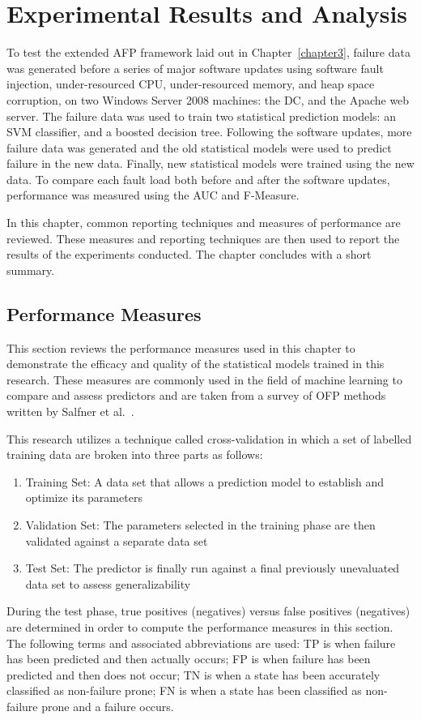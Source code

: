 \chapter{Experimental Results and Analysis} \label{chapter4}
To test the extended \ac{AFP} framework laid out in Chapter~\ref{chapter3},
failure data was generated before a series of major software updates using
software fault injection, under-resourced \ac{CPU}, under-resourced memory, and
heap space corruption, on two Windows Server 2008 machines: the \ac{DC}, and
the Apache web server.  The failure data was used to train two statistical
prediction models: an \ac{SVM} classifier, and a boosted decision tree.
Following the software updates, more failure data was generated and the old
statistical models were used to predict failure in the new data.  Finally, new
statistical models were trained using the new data.  To compare each fault load
both before and after the software updates, performance was measured using the
\ac{AUC} and F-Measure.

In this chapter, common reporting techniques and measures of performance are
reviewed.  These measures and reporting techniques are then used to report the
results of the experiments conducted.  The chapter concludes with a short
summary.

\section{Performance Measures} \label{metrics}
This section reviews the performance measures used in this chapter to
demonstrate the efficacy and quality of the statistical models trained in this
research.  These measures are commonly used in the field of machine learning to
compare and assess predictors and are taken from a survey of \ac{OFP} methods
written by Salfner et al.~\cite{salfnerSurvey}.

This research utilizes a technique called cross-validation in which a set of
labelled training data are broken into three parts as follows:
\begin{enumerate}
\item{Training Set:  A data set that allows a prediction model to establish and
optimize its parameters}
\item{Validation Set:  The parameters selected in the training phase are then
validated against a separate data set}
\item{Test Set:  The predictor is finally run against a final previously
unevaluated data set to assess generalizability}
\end{enumerate}
During the test phase, true positives (negatives) versus false positives
(negatives) are determined in order to compute the performance measures in this
section.  The following terms and associated abbreviations are used: \ac{TP} is
when failure has been predicted and then actually occurs; \ac{FP} is when
failure has been predicted and then does not occur; \ac{TN} is when a state has
been accurately classified as non-failure prone; \ac{FN} is when a state has
been classified as non-failure prone and a failure occurs.

